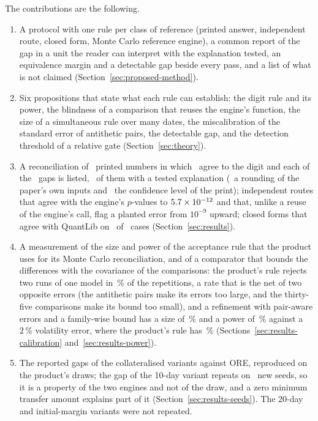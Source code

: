 The contributions are the following.
\begin{enumerate}
\item A protocol with one rule per class of reference (printed answer, independent route, closed form, Monte Carlo reference engine), a common report of the gap in a unit the reader can interpret with the explanation tested, an equivalence margin and a detectable gap beside every pass, and a list of what is not claimed (Section~\ref{sec:proposed-method}).
\item Six propositions that state what each rule can establish: the digit rule and its power, the blindness of a comparison that reuses the engine's function, the size of a simultaneous rule over many dates, the miscalibration of the standard error of antithetic pairs, the detectable gap, and the detection threshold of a relative gate (Section~\ref{sec:theory}).
\item A reconciliation of \nPrintedN\ printed numbers in which \nPrintedAgree\ agree to the digit and each of the \nMissTotal\ gaps is listed, \nMissTested\ of them with a tested explanation (\nMissRound\ a rounding of the paper's own inputs and \nMissLevel\ the confidence level of the print); independent routes that agree with the engine's $p$-values to $5.7\times10^{-12}$ and that, unlike a reuse of the engine's call, flag a planted error from $10^{-9}$ upward; closed forms that agree with QuantLib on \nClosedWithin\ of \nClosedCases\ cases (Section~\ref{sec:results}).
\item A measurement of the size and power of the acceptance rule that the product uses for its Monte Carlo reconciliation, and of a comparator that bounds the differences with the covariance of the comparisons: the product's rule rejects two runs of one model in \nSizeProdNetting\,\% of the repetitions, a rate that is the net of two opposite errors (the antithetic pairs make its errors too large, and the thirty-five comparisons make its bound too small), and a refinement with pair-aware errors and a family-wise bound has a size of \nSizeRefineNetting\,\% and a power of \nPowerRefineSigmaTwo\,\% against a $2\,\%$ volatility error, where the product's rule has \nPowerProdSigmaTwo\,\% (Sections~\ref{sec:results-calibration} and~\ref{sec:results-power}).
\item The reported gaps of the collateralised variants against ORE, reproduced on the product's draws; the gap of the 10-day variant repeats on \nReplCsaN\ new seeds, so it is a property of the two engines and not of the draw, and a zero minimum transfer amount explains part of it (Section~\ref{sec:results-seeds}). The 20-day and initial-margin variants were not repeated.
\end{enumerate}


